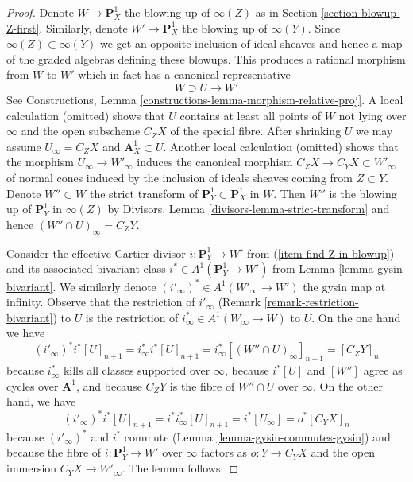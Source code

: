 \begin{proof}
Denote $W \to \mathbf{P}^1_X$ the blowing up of $\infty(Z)$ as in
Section \ref{section-blowup-Z-first}.
Similarly, denote $W' \to \mathbf{P}^1_X$ the blowing up of $\infty(Y)$.
Since $\infty(Z) \subset \infty(Y)$ we get an opposite inclusion
of ideal sheaves and hence a map of the graded algebras
defining these blowups. This produces a rational morphism from $W$
to $W'$ which in fact has a canonical representative
$$
W \supset U \longrightarrow W'
$$
See Constructions, Lemma \ref{constructions-lemma-morphism-relative-proj}.
A local calculation (omitted) shows that $U$ contains at least all points
of $W$ not lying over $\infty$ and the open subscheme $C_Z X$ of the special
fibre. After shrinking $U$ we may assume $U_\infty = C_Z X$ and
$\mathbf{A}^1_X \subset U$. Another local calculation (omitted)
shows that the morphism $U_\infty \to W'_\infty$
induces the canonical morphism $C_Z X \to C_Y X \subset W'_\infty$
of normal cones induced by the inclusion of ideals sheaves
coming from $Z \subset Y$. Denote $W'' \subset W$ the strict transform of
$\mathbf{P}^1_Y \subset \mathbf{P}^1_X$ in $W$. Then $W''$ is the blowing
up of $\mathbf{P}^1_Y$ in $\infty(Z)$ by
Divisors, Lemma \ref{divisors-lemma-strict-transform}
and hence $(W'' \cap U)_\infty = C_ZY$.

\medskip\noindent
Consider the effective Cartier divisor $i : \mathbf{P}^1_Y \to W'$
from (\ref{item-find-Z-in-blowup}) and its associated bivariant class
$i^* \in A^1(\mathbf{P}^1_Y \to W')$ from Lemma \ref{lemma-gysin-bivariant}.
We similarly denote $(i'_\infty)^* \in A^1(W'_\infty \to W')$ the
gysin map at infinity. Observe that the restriction of $i'_\infty$
(Remark \ref{remark-restriction-bivariant}) to $U$ is the restriction of
$i_\infty^* \in A^1(W_\infty \to W)$ to $U$. On the one hand we have
$$
(i'_\infty)^* i^* [U]_{n + 1} =
i_\infty^* i^* [U]_{n + 1} =
i_\infty^* [(W'' \cap U)_\infty]_{n + 1} =
[C_ZY]_n
$$
because $i_\infty^*$ kills all classes supported over $\infty$, because
$i^*[U]$ and $[W'']$ agree as cycles over $\mathbf{A}^1$, and because
$C_ZY$ is the fibre of $W'' \cap U$ over $\infty$.
On the other hand, we have
$$
(i'_\infty)^* i^* [U]_{n + 1} =
i^* i_\infty^*[U]_{n + 1} =
i^* [U_\infty] =
o^*[C_YX]_n
$$
because $(i'_\infty)^*$ and $i^*$ commute
(Lemma \ref{lemma-gysin-commutes-gysin})
and because the fibre of $i : \mathbf{P}^1_Y \to W'$ over $\infty$
factors as $o : Y \to C_YX$ and the open immersion $C_YX \to W'_\infty$.
The lemma follows.
\end{proof}

